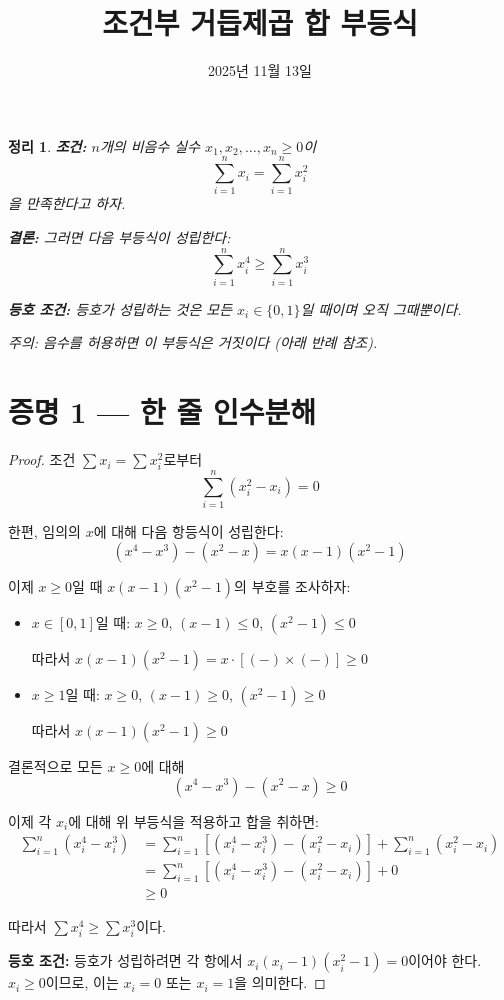 \documentclass[12pt,a4paper]{article}
\title{\textbf{조건부 거듭제곱 합 부등식}}
\author{}
\date{2025년 11월 13일}
\newtheorem{theorem}{정리}
\theoremstyle{definition}
\begin{document}
\maketitle

\begin{theorem}
\textbf{조건:} $n$개의 비음수 실수 $x_1, x_2, \ldots, x_n \geq 0$이
\[
\sum_{i=1}^n x_i = \sum_{i=1}^n x_i^2
\]
을 만족한다고 하자.

\textbf{결론:} 그러면 다음 부등식이 성립한다:
\[
\sum_{i=1}^n x_i^4 \geq \sum_{i=1}^n x_i^3
\]

\textbf{등호 조건:} 등호가 성립하는 것은 모든 $x_i \in \{0, 1\}$일 때이며 오직 그때뿐이다.

\textit{주의:} 음수를 허용하면 이 부등식은 거짓이다 (아래 반례 참조).
\end{theorem}

\section*{증명 1 --- 한 줄 인수분해}

\begin{proof}
조건 $\sum x_i = \sum x_i^2$로부터
\[
\sum_{i=1}^n (x_i^2 - x_i) = 0
\]

한편, 임의의 $x$에 대해 다음 항등식이 성립한다:
\[
(x^4 - x^3) - (x^2 - x) = x(x-1)(x^2-1)
\]

이제 $x \geq 0$일 때 $x(x-1)(x^2-1)$의 부호를 조사하자:
\begin{itemize}[leftmargin=1.5cm]
    \item $x \in [0, 1]$일 때: $x \geq 0$, $(x-1) \leq 0$, $(x^2-1) \leq 0$

    따라서 $x(x-1)(x^2-1) = x \cdot [(-) \times (-)] \geq 0$

    \item $x \geq 1$일 때: $x \geq 0$, $(x-1) \geq 0$, $(x^2-1) \geq 0$

    따라서 $x(x-1)(x^2-1) \geq 0$
\end{itemize}

결론적으로 모든 $x \geq 0$에 대해
\[
(x^4 - x^3) - (x^2 - x) \geq 0
\]

이제 각 $x_i$에 대해 위 부등식을 적용하고 합을 취하면:
\begin{align*}
\sum_{i=1}^n (x_i^4 - x_i^3) &= \sum_{i=1}^n \left[(x_i^4 - x_i^3) - (x_i^2 - x_i)\right] + \sum_{i=1}^n (x_i^2 - x_i) \\
&= \sum_{i=1}^n \left[(x_i^4 - x_i^3) - (x_i^2 - x_i)\right] + 0 \\
&\geq 0
\end{align*}

따라서 $\sum x_i^4 \geq \sum x_i^3$이다.

\textbf{등호 조건:}
등호가 성립하려면 각 항에서 $x_i(x_i-1)(x_i^2-1) = 0$이어야 한다.
$x_i \geq 0$이므로, 이는 $x_i = 0$ 또는 $x_i = 1$을 의미한다.
\end{proof}
\end{document}
